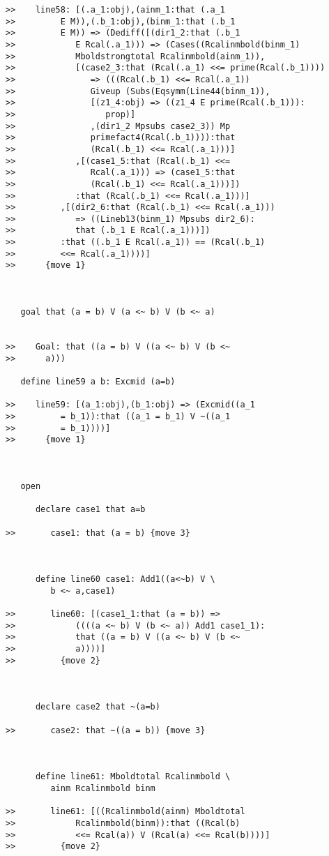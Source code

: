 \documentclass[12pt]{article}
\begin{document}
\begin{verbatim}
>>    line58: [(.a_1:obj),(ainm_1:that (.a_1
>>         E M)),(.b_1:obj),(binm_1:that (.b_1
>>         E M)) => (Dediff([(dir1_2:that (.b_1
>>            E Rcal(.a_1))) => (Cases((Rcalinmbold(binm_1)
>>            Mboldstrongtotal Rcalinmbold(ainm_1)),
>>            [(case2_3:that (Rcal(.a_1) <<= prime(Rcal(.b_1))))
>>               => (((Rcal(.b_1) <<= Rcal(.a_1))
>>               Giveup (Subs(Eqsymm(Line44(binm_1)),
>>               [(z1_4:obj) => ((z1_4 E prime(Rcal(.b_1))):
>>                  prop)]
>>               ,(dir1_2 Mpsubs case2_3)) Mp
>>               primefact4(Rcal(.b_1)))):that
>>               (Rcal(.b_1) <<= Rcal(.a_1)))]
>>            ,[(case1_5:that (Rcal(.b_1) <<=
>>               Rcal(.a_1))) => (case1_5:that
>>               (Rcal(.b_1) <<= Rcal(.a_1)))])
>>            :that (Rcal(.b_1) <<= Rcal(.a_1)))]
>>         ,[(dir2_6:that (Rcal(.b_1) <<= Rcal(.a_1)))
>>            => ((Lineb13(binm_1) Mpsubs dir2_6):
>>            that (.b_1 E Rcal(.a_1)))])
>>         :that ((.b_1 E Rcal(.a_1)) == (Rcal(.b_1)
>>         <<= Rcal(.a_1))))]
>>      {move 1}



   goal that (a = b) V (a <~ b) V (b <~ a)


>>    Goal: that ((a = b) V ((a <~ b) V (b <~
>>      a)))

   define line59 a b: Excmid (a=b)

>>    line59: [(a_1:obj),(b_1:obj) => (Excmid((a_1
>>         = b_1)):that ((a_1 = b_1) V ~((a_1
>>         = b_1))))]
>>      {move 1}



   open

      declare case1 that a=b

>>       case1: that (a = b) {move 3}



      define line60 case1: Add1((a<~b) V \
         b <~ a,case1)

>>       line60: [(case1_1:that (a = b)) =>
>>            ((((a <~ b) V (b <~ a)) Add1 case1_1):
>>            that ((a = b) V ((a <~ b) V (b <~
>>            a))))]
>>         {move 2}



      declare case2 that ~(a=b)

>>       case2: that ~((a = b)) {move 3}



      define line61: Mboldtotal Rcalinmbold \
         ainm Rcalinmbold binm

>>       line61: [((Rcalinmbold(ainm) Mboldtotal
>>            Rcalinmbold(binm)):that ((Rcal(b)
>>            <<= Rcal(a)) V (Rcal(a) <<= Rcal(b))))]
>>         {move 2}




\end{verbatim}
\end{document}

